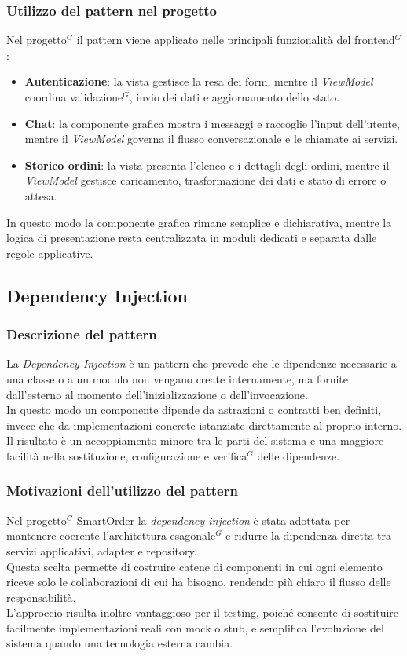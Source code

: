 \subsubsection{Utilizzo del pattern nel progetto}
Nel progetto$^G$ il pattern viene applicato nelle principali funzionalit\`a del frontend$^G$:
\begin{itemize}
	\item \textbf{Autenticazione}: la vista gestisce la resa dei form, mentre il \textit{ViewModel} coordina validazione$^G$, invio dei dati e aggiornamento dello stato.
	\item \textbf{Chat}: la componente grafica mostra i messaggi e raccoglie l'input dell'utente, mentre il \textit{ViewModel} governa il flusso conversazionale e le chiamate ai servizi.
	\item \textbf{Storico ordini}: la vista presenta l'elenco e i dettagli degli ordini, mentre il \textit{ViewModel} gestisce caricamento, trasformazione dei dati e stato di errore o attesa.
\end{itemize}
In questo modo la componente grafica rimane semplice e dichiarativa, mentre la logica di presentazione resta centralizzata in moduli dedicati e separata dalle regole applicative.

\subsection{Dependency Injection}
\subsubsection{Descrizione del pattern}
La \textit{Dependency Injection} \`e un pattern che prevede che le dipendenze necessarie a una classe o a un modulo non vengano create internamente, ma fornite dall'esterno al momento dell'inizializzazione o dell'invocazione.\\
In questo modo un componente dipende da astrazioni o contratti ben definiti, invece che da implementazioni concrete istanziate direttamente al proprio interno.\\
Il risultato \`e un accoppiamento minore tra le parti del sistema e una maggiore facilit\`a nella sostituzione, configurazione e verifica$^G$ delle dipendenze.
\subsubsection{Motivazioni dell'utilizzo del pattern}
Nel progetto$^G$ SmartOrder la \textit{dependency injection} \`e stata adottata per mantenere coerente l'architettura esagonale$^G$ e ridurre la dipendenza diretta tra servizi applicativi, adapter e repository.\\
Questa scelta permette di costruire catene di componenti in cui ogni elemento riceve solo le collaborazioni di cui ha bisogno, rendendo pi\`u chiaro il flusso delle responsabilit\`a.\\
L'approccio risulta inoltre vantaggioso per il testing, poich\'e consente di sostituire facilmente implementazioni reali con mock o stub, e semplifica l'evoluzione del sistema quando una tecnologia esterna cambia.
